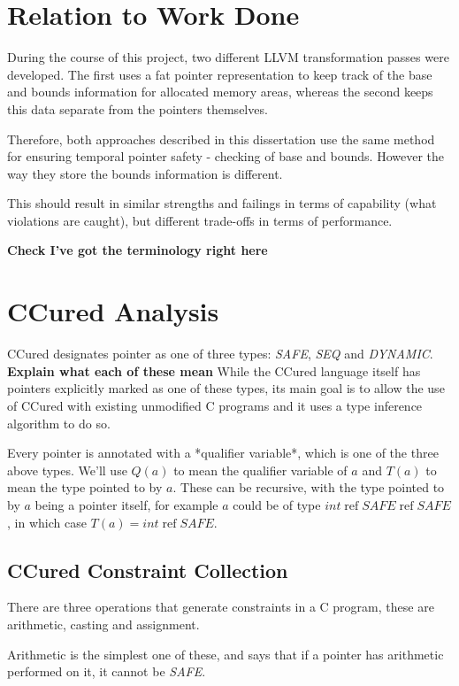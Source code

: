 \section{Relation to Work Done}

During the course of this project, two different LLVM transformation passes were developed.
The first uses a fat pointer representation to keep track of the base and bounds information for allocated memory areas, whereas the second keeps this data separate from the pointers themselves.

Therefore, both approaches described in this dissertation use the same method for ensuring temporal pointer safety - checking of base and bounds.
However the way they store the bounds information is different.

This should result in similar strengths and failings in terms of capability (what violations are caught), but different trade-offs in terms of performance.


\textbf{Check I've got the terminology right here}

\section{CCured Analysis}

CCured designates pointer as one of three types: \textit{SAFE}, \textit{SEQ} and \textit{DYNAMIC}.
\textbf{Explain what each of these mean}
While the CCured language itself has pointers explicitly marked as one of these types, its main goal is to allow the use of CCured with existing unmodified C programs and it uses a type inference algorithm to do so.

Every pointer is annotated with a *qualifier variable*, which is one of the three above types.
We'll use $Q(a)$ to mean the qualifier variable of $a$ and $T(a)$ to mean the type pointed to by $a$.
These can be recursive, with the type pointed to by $a$ being a pointer itself, for example $a$ could be of type $int\; \mbox{ref}\; SAFE\; \mbox{ref}\; SAFE$, in which case $T(a) = int\;\mbox{ref}\;SAFE$.

\subsection{CCured Constraint Collection}

There are three operations that generate constraints in a C program, these are arithmetic, casting and assignment.

Arithmetic is the simplest one of these, and says that if a pointer has arithmetic performed on it, it cannot be \textit{SAFE}.

